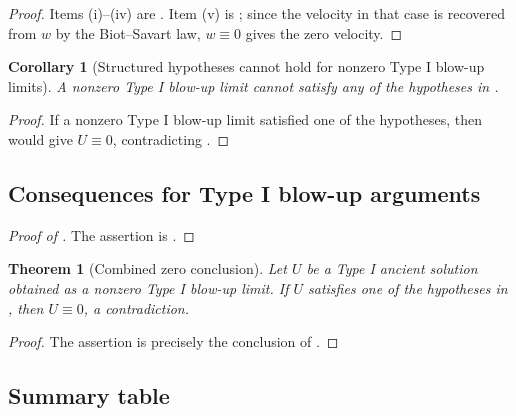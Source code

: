 \documentclass[11pt]{amsart}
\theoremstyle{plain}
\newtheorem{theorem}{Theorem}[section]
\newtheorem{corollary}[corollary]{Corollary}
\theoremstyle{definition}
\theoremstyle{remark}
\numberwithin{equation}{section}
\begin{document}
\begin{proof}
Items (i)--(iv) are .  Item (v) is
; since the velocity in that
case is recovered from \(w\) by the Biot--Savart law, \(w\equiv0\) gives the
zero velocity.
\end{proof}

\begin{corollary}[Structured hypotheses cannot hold for nonzero Type I blow-up limits]
\label{p3:cor:structured-hypotheses-nonzero-blowup}
A nonzero Type I blow-up limit cannot satisfy any of the hypotheses in
.
\end{corollary}

\begin{proof}
If a nonzero Type I blow-up limit satisfied one of the hypotheses, then
 would give \(U\equiv0\), contradicting
.
\end{proof}

\subsection{Consequences for Type I blow-up arguments}

\begin{proof}[Proof of ]
The assertion is .
\end{proof}

\begin{theorem}[Combined zero conclusion]
\label{p3:thm:stated-hypotheses-zero}
Let \(U\) be a Type I ancient solution obtained as a nonzero Type I blow-up
limit.  If \(U\) satisfies one of the hypotheses in
, then \(U\equiv0\), a contradiction.
\end{theorem}

\begin{proof}
The assertion is precisely the conclusion of
.
\end{proof}

\subsection{Summary table}
\end{document}
